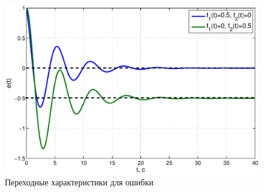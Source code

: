 \documentclass[12pt,a4paper]{article}
\begin{document}
\begin{figure}[H]
    \centering
    \includegraphics[width=1\linewidth]{3.2.eps}
    \caption{Переходные характеристики для ошибки}
\end{figure}
\end{document}
